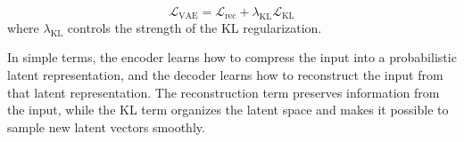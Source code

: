 \documentclass[a4paper]{article}
\begin{document}
        \begin{equation}
            \mathcal{L}_{\mathrm{VAE}}
            =
            \mathcal{L}_{\mathrm{rec}}
            +
            \lambda_{\mathrm{KL}}
            \mathcal{L}_{\mathrm{KL}}
        \end{equation}
        where $\lambda_{\mathrm{KL}}$ controls the strength of the KL regularization.
        
        In simple terms, the encoder learns how to compress the input into a probabilistic latent representation, and the decoder learns how to reconstruct the input from that latent representation. The reconstruction term preserves information from the input, while the KL term organizes the latent space and makes it possible to sample new latent vectors smoothly.
        
        
\end{document}
